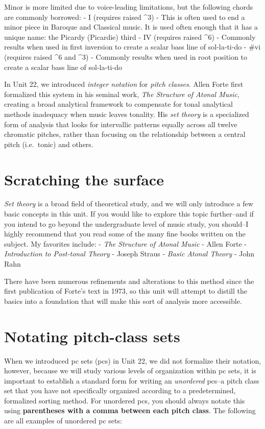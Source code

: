 \documentclass{book}
\begin{document}
Minor is more limited due to voice-leading limitations, but the following
chords are commonly borrowed: - I (requires raised \^{}3) - This is often used
to end a minor piece in Baroque and Classical music. It is used often enough
that it has a unique name: the Picardy (Picardie) third - IV (requires raised
\^{}6) - Commonly results when used in first inversion to create a scalar bass
line of sol-la-ti-do - \#vi (requires raised \^{}6 and \^{}3) - Commonly
results when used in root position to create a scalar bass line of
sol-la-ti-do

In Unit 22, we introduced \emph{integer notation} for \emph{pitch classes}.
Allen Forte first formalized this system in his seminal work, \emph{The
Structure of Atonal Music}, creating a broad analytical framework to
compensate for tonal analytical methods inadequacy when music leaves tonality.
His \emph{set theory} is a specialized form of analysis that looks for
intervallic patterns equally across all twelve chromatic pitches, rather than
focusing on the relationship between a central pitch (i.e.~tonic) and others.

\hypertarget{scratching-the-surface}{%
\section{Scratching the surface}\label{scratching-the-surface}}

\emph{Set theory} is a broad field of theoretical study, and we will only
introduce a few basic concepts in this unit. If you would like to explore this
topic further--and if you intend to go beyond the undergraduate level of music
study, you should--I highly recommend that you read some of the many fine
books written on the subject. My favorites include: - \emph{The Structure of
Atonal Music} - Allen Forte - \emph{Introduction to Post-tonal Theory} -
Joseph Straus - \emph{Basic Atonal Theory} - John Rahn

There have been numerous refinements and alterations to this method since the
first publication of Forte's text in 1973, so this unit will attempt to
distill the basics into a foundation that will make this sort of analysis more
accessible.

\hypertarget{notating-pitch-class-sets}{%
\section{Notating pitch-class sets}\label{notating-pitch-class-sets}}

When we introduced pc sets (pcs) in Unit 22, we did not formalize their
notation, however, because we will study various levels of organization within
pc sets, it is important to establish a standard form for writing an
\emph{unordered} pcs--a pitch class set that you have not specifically
organized according to a predetermined, formalized sorting method. For
unordered pcs, you should always notate this using \textbf{parentheses with a
comma between each pitch class}. The following are all examples of unordered
pc sets:
\end{document}
